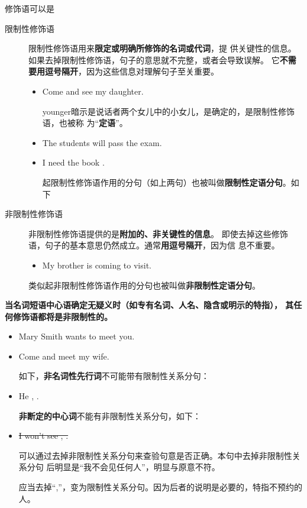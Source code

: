 修饰语可以是
\begin{description}
\item[限制性修饰语] 限制性修饰语用来\textbf{限定或明确所修饰的名词或代词}，提
  供关键性的信息。如果去掉限制性修饰语，句子的意思就不完整，或者会导致误解。
  它\textbf{不需要用逗号隔开}，因为这些信息对理解句子至关重要。
  \begin{itemize}

  \item Come and see my  daughter.

    younger暗示是说话者两个女儿中的小女儿，是确定的，是限制性修饰语，也被称
    为“\textbf{定语}”。

  \item The students  will pass the exam.

  \item I need the book .

    起限制性修饰语作用的分句（如上两句）也被叫做\textbf{限制性定语分句}。如下
  \end{itemize}


\item[非限制性修饰语] 非限制性修饰语提供的是\textbf{附加的、非关键性的信息}。
  即使去掉这些修饰语，句子的基本意思仍然成立。通常\textbf{用逗号隔开}，因为信
  息不重要。
  \begin{itemize}
  \item My brother is coming to visit.
  \end{itemize}

  类似起非限制性修饰语作用的分句也被叫做\textbf{非限制性定语分句}。
\end{description}

\textbf{当名词短语中心语确定无疑义时（如专有名词、人名、隐含或明示的特指），
  其任何修饰语都将是非限制性的。}
\begin{itemize}
\item Mary Smith wants to meet you.
\item Come and meet my  wife.

  如下，\textbf{非名词性先行词}不可能带有限制性关系分句：

\item He , .

  \textbf{非断定的中心词}不能有非限制性关系分句，如下：

\item \sout{I won't see , .}

  可以通过去掉非限制性关系分句来查验句意是否正确。本句中去掉非限制性关系分句
  后明显是“我不会见任何人”，明显与原意不符。

  应当去掉“,”，变为限制性关系分句。因为后者的说明是必要的，特指不预约的人。
\end{itemize}










